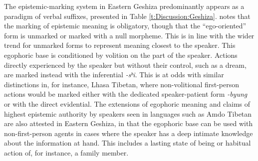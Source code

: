 The epistemic-marking system in Eastern Geshiza predominantly appears as a paradigm of verbal suffixes, presented in Table \ref{t:Discussion:Geshiza}.  notes that the marking of epistemic meaning is obligatory, though that the ``ego-oriented'' form is unmarked or marked with a null morpheme. This is in line with the wider trend for unmarked forms to represent meaning closest to the speaker. This egophoric base is conditioned by volition on the part of the speaker. Actions directly experienced by the speaker but without their control, such as a dream, are marked instead with the inferential \textit{-sʰi}. This is at odds with similar distinctions in, for instance, Lhasa Tibetan, where non-volitional first-person actions would be marked either with the dedicated speaker-patient form \textit{-byung} or with the direct evidential. The extensions of egophoric meaning and claims of highest epistemic authority by speakers seen in languages such as Amdo Tibetan \cite{Tribur2019} are also attested in Eastern Geshiza, in that the egophoric base can be used with non-first-person agents in cases where the speaker has a deep intimate knowledge about the information at hand. This includes a lasting state of being or habitual action of, for instance, a family member.

